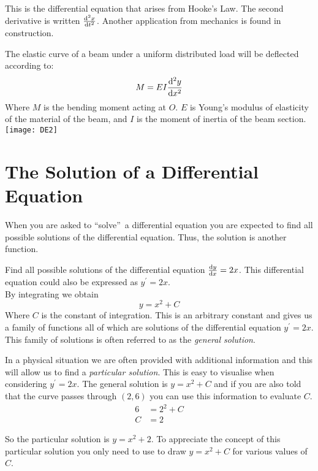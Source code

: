 This is the differential equation that arises from Hooke's Law. The second derivative is written $\frac{\mathrm{d}^2x}{\mathrm{d}t^2}$. Another application from mechanics is found in construction.
\begin{multicols}{2} The elastic curve of a beam under a uniform distributed load will be deflected according to:
	\[M=EI\frac{\mathrm{d}^2y}{\mathrm{d}x^2}\]
Where $M$ is the bending moment acting at $O$. $E$ is Young’s modulus of elasticity of the material of the beam, and $I$ is the moment of inertia of the beam section.\\
\texttt{[image: DE2]}
\end{multicols} 

\section*{The Solution of a Differential Equation}
When you are asked to ``solve''\ a differential equation you are expected to find all possible solutions of the differential equation. Thus, the solution is another function.

\example Find all possible solutions of the differential equation $\frac{\mathrm{d}y}{\mathrm{d}x} =2 x$.  This differential equation could also be expressed as $y^{ \prime } =2 x\text{.}$\medskip\\
\solution By integrating we obtain
\begin{equation*}y =x^{2} +C
\end{equation*}
Where $C$ is the constant of integration.  This is an arbitrary constant and gives us a family of functions all of which are solutions of the differential equation $y^{ \prime } =2 x$.  This family of solutions is often referred to as the \emph{general solution}.

In a physical situation we are often provided with additional information and this will allow us to find a \emph{particular solution}.  This is easy to visualise when considering $y^{ \prime } =2 x\text{.}$  The general solution is $y =x^{2} +C$ and if you are also told that the curve passes through $\left (2 ,6\right )$ you can use this information to evaluate $C\text{.}$
\begin{align*}6 &    = 2^{2} +C \\
C &    = 2\end{align*}

So the particular solution is $y =x^{2} +2$.  To appreciate the concept of this particular solution you only need to use \desmos to
draw $y =x^{2} +C$ for various values of $C$. 

